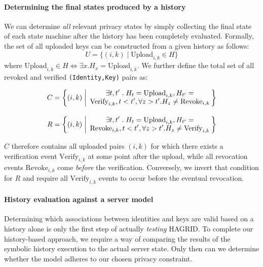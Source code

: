 \paragraph{Determining the final states produced by a history}
We can determine \emph{all} relevant privacy states by simply collecting the final state of each state machine after the history has been completely evaluated.
Formally, the set of all uploaded keys can be constructed from a given history as follows:
\newcommand{\pctext}[2]{\text{\parbox{#1}{\centering #2}}}
\[U = \biggl \{(i,k) \;\bigg|\; \text{Upload}_{i,k} \in H \biggr\}\]
where \(\text{Upload}_{i,k} \in H \Leftrightarrow \exists x. H_x = \text{Upload}_{i,k}\). 
We further define the total set of all revoked and verified \texttt{(Identity,Key)} pairs as:

\begin{equation}
    \label{eq:states}
    \begin{alignedat}{2}
        C &= \biggl \{(i,k) &&\;\bigg|\; \pctext{2.4in}{\(\exists t,t'\;.\; H_t = \text{Upload}_{i,k},H_{t'} = \text{Verify}_{i,k}, t < t', \forall z > t'. H_z \neq \text{Revoke}_{i,k}\)}  \biggr \} \\[10pt]
        R &= \biggl \{(i,k) &&\;\bigg|\; \pctext{2.4in}{\(\exists t,t'\;.\; H_t = \text{Upload}_{i,k},H_{t'} = \text{Revoke}_{i,k}, t < t', \forall z > t'. H_z \neq \text{Verify}_{i,k}\)}  \biggr \}
    \end{alignedat}
\end{equation}

\(C\) therefore contains all uploaded pairs \((i,k)\) for which there exists a verification event \(\text{Verify}_{i,k}\) at some point after the upload, while all revocation events \(\text{Revoke}_{i,k}\) come \emph{before} the verification. Conversely, we invert that condition for \(R\) and require all \(\text{Verify}_{i,k}\) events to occur before the eventual revocation.


\paragraph{History evaluation against a server model}
Determining which associations between identities and keys are valid based on a history alone is only the first step of actually \emph{testing} HAGRID. To complete our history-based approach, we require a way of comparing the results of the symbolic history execution to the actual server state. Only then can we determine whether the model adheres to our chosen privacy constraint.

